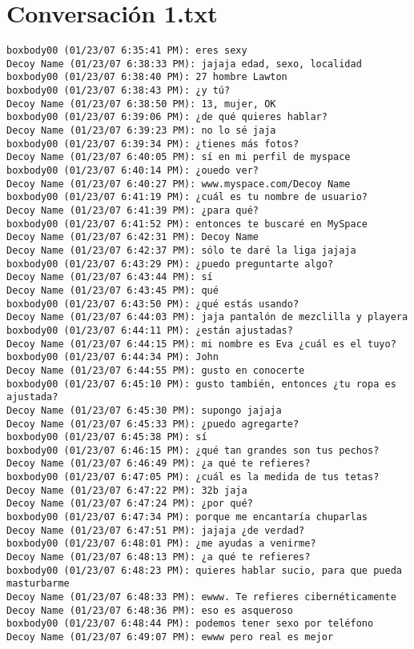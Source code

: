 \section{Conversaci\'on 1.txt}

\begin{verbatim}
boxbody00 (01/23/07 6:35:41 PM): eres sexy
Decoy Name (01/23/07 6:38:33 PM): jajaja edad, sexo, localidad
boxbody00 (01/23/07 6:38:40 PM): 27 hombre Lawton
boxbody00 (01/23/07 6:38:43 PM): ¿y tú?
Decoy Name (01/23/07 6:38:50 PM): 13, mujer, OK
boxbody00 (01/23/07 6:39:06 PM): ¿de qué quieres hablar?
Decoy Name (01/23/07 6:39:23 PM): no lo sé jaja
boxbody00 (01/23/07 6:39:34 PM): ¿tienes más fotos?
Decoy Name (01/23/07 6:40:05 PM): sí en mi perfil de myspace
boxbody00 (01/23/07 6:40:14 PM): ¿ouedo ver?
Decoy Name (01/23/07 6:40:27 PM): www.myspace.com/Decoy Name
boxbody00 (01/23/07 6:41:19 PM): ¿cuál es tu nombre de usuario?
Decoy Name (01/23/07 6:41:39 PM): ¿para qué?
boxbody00 (01/23/07 6:41:52 PM): entonces te buscaré en MySpace
Decoy Name (01/23/07 6:42:31 PM): Decoy Name
Decoy Name (01/23/07 6:42:37 PM): sólo te daré la liga jajaja
boxbody00 (01/23/07 6:43:29 PM): ¿puedo preguntarte algo?
Decoy Name (01/23/07 6:43:44 PM): sí
Decoy Name (01/23/07 6:43:45 PM): qué
boxbody00 (01/23/07 6:43:50 PM): ¿qué estás usando?
Decoy Name (01/23/07 6:44:03 PM): jaja pantalón de mezclilla y playera
boxbody00 (01/23/07 6:44:11 PM): ¿están ajustadas?
Decoy Name (01/23/07 6:44:15 PM): mi nombre es Eva ¿cuál es el tuyo?
boxbody00 (01/23/07 6:44:34 PM): John
Decoy Name (01/23/07 6:44:55 PM): gusto en conocerte 
boxbody00 (01/23/07 6:45:10 PM): gusto también, entonces ¿tu ropa es ajustada?
Decoy Name (01/23/07 6:45:30 PM): supongo jajaja
Decoy Name (01/23/07 6:45:33 PM): ¿puedo agregarte?
boxbody00 (01/23/07 6:45:38 PM): sí
boxbody00 (01/23/07 6:46:15 PM): ¿qué tan grandes son tus pechos?
Decoy Name (01/23/07 6:46:49 PM): ¿a qué te refieres?
boxbody00 (01/23/07 6:47:05 PM): ¿cuál es la medida de tus tetas? 
Decoy Name (01/23/07 6:47:22 PM): 32b jaja
Decoy Name (01/23/07 6:47:24 PM): ¿por qué?
boxbody00 (01/23/07 6:47:34 PM): porque me encantaría chuparlas
Decoy Name (01/23/07 6:47:51 PM): jajaja ¿de verdad?
boxbody00 (01/23/07 6:48:01 PM): ¿me ayudas a venirme?
Decoy Name (01/23/07 6:48:13 PM): ¿a qué te refieres?
boxbody00 (01/23/07 6:48:23 PM): quieres hablar sucio, para que pueda masturbarme
Decoy Name (01/23/07 6:48:33 PM): ewww. Te refieres cibernéticamente
Decoy Name (01/23/07 6:48:36 PM): eso es asqueroso 
boxbody00 (01/23/07 6:48:44 PM): podemos tener sexo por teléfono
Decoy Name (01/23/07 6:49:07 PM): ewww pero real es mejor

\end{verbatim}
